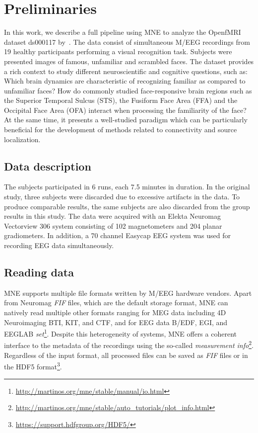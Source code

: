 \section{Preliminaries}

In this work, we describe a full pipeline using MNE to analyze the OpenfMRI dataset ds000117 by~\cite{wakeman2015multi}. The data consist of simultaneous M/EEG recordings from 19 healthy participants performing a visual recognition task. Subjects were presented images of famous, unfamiliar and scrambled faces. The dataset provides a rich context to study different neuroscientific and cognitive questions, such as: Which brain dynamics are characteristic of recognizing familiar as compared to unfamiliar faces? How do commonly studied face-responsive brain regions such as the Superior Temporal Sulcus (STS), the Fusiform Face Area (FFA) and the Occipital Face Area (OFA) interact when processing the familiarity of the face? At the same time, it presents a well-studied paradigm which can be particularly beneficial for the development of methods related to connectivity and source localization.

\subsection{Data description}

The subjects participated in 6 runs, each 7.5 minutes in duration. In the original study, three subjects were discarded due to excessive artifacts in the data. To produce comparable results, the same subjects are also discarded from the group results in this study. The data were acquired with an Elekta Neuromag Vectorview 306 system consisting of 102 magnetometers and 204 planar gradiometers. In addition, a 70 channel Easycap EEG system was used for recording EEG data simultaneously.

\subsection{Reading data}
MNE supports multiple file formats written by M/EEG hardware vendors.
Apart from Neuromag \textit{FIF} files, which are the default storage format, MNE can natively read multiple other formats ranging for MEG data including 4D Neuroimaging BTI, KIT, and CTF, and for EEG data B/EDF, EGI, and EEGLAB \textit{set}\footnote{\url{http://martinos.org/mne/stable/manual/io.html}}. Despite this heterogeneity of systems, MNE offers a coherent interface to the metadata of the recordings using the so-called \emph{measurement info}\footnote{\url{http://martinos.org/mne/stable/auto_tutorials/plot_info.html}}.
Regardless of the input format, all processed files can be saved as \textit{FIF} files or in the HDF5 format\footnote{\url{https://support.hdfgroup.org/HDF5/}}.

